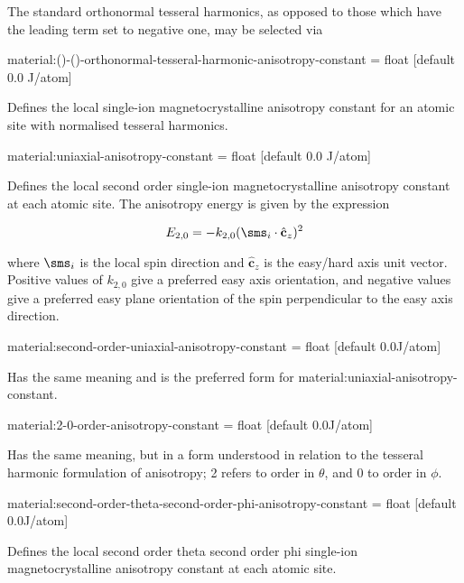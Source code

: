 \noindent The standard orthonormal tesseral harmonics, as opposed to those which have the leading term set to negative one, may be selected via

{\zicf material:()-()-orthonormal-tesseral-harmonic-anisotropy-constant = float [default 0.0 J/atom]} Defines the local single-ion magnetocrystalline anisotropy constant for an atomic site with normalised tesseral harmonics.

{\zicf material:uniaxial-anisotropy-constant = float [default 0.0 J/atom]} Defines the local second order single-ion magnetocrystalline anisotropy constant at each atomic site. The anisotropy energy is given by the expression

\begin{equation*}
E_{2,0} = -k_{2,0} (\sms_i \cdot \hat{\mathbf{c}}_z )^2
\end{equation*}

\noindent where $\sms_i$ is the local spin direction and $\hat{\mathbf{c}}_z$ is the easy/hard axis unit vector. Positive values of $k_{2,0}$ give a preferred easy axis orientation, and negative values give a preferred easy plane orientation of the spin perpendicular to the easy axis direction.

{\zicf material:second-order-uniaxial-anisotropy-constant = float [default 0.0\newline J/atom]} Has the same meaning and is the preferred form for material:uniaxial-anisotropy-constant.

{\zicf material:2-0-order-anisotropy-constant = float [default 0.0\newline J/atom]} Has the same meaning, but in a form understood in relation to the tesseral harmonic formulation of anisotropy; 2 refers to order in $\theta$, and 0 to order in $\phi$.

{\zicf material:second-order-theta-second-order-phi-anisotropy-constant = float [default 0.0\newline J/atom]} Defines the local second order theta second order phi single-ion magnetocrystalline anisotropy constant at each atomic site.

